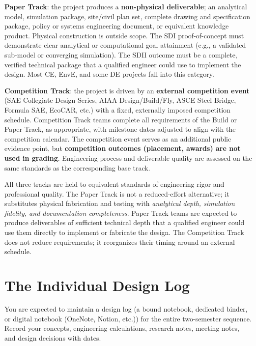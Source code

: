 \textbf{Paper Track}: the project produces a \textbf{non-physical deliverable}; an analytical model, simulation package, site/civil plan set, complete drawing and specification package, policy or systems engineering document, or equivalent knowledge product. Physical construction is outside scope. The SDI proof-of-concept must demonstrate clear analytical or computational goal attainment (e.g., a validated sub-model or converging simulation). The SDII outcome must be a complete, verified technical package that a qualified engineer could use to implement the design. Most CE, EnvE, and some DE projects fall into this category.

\textbf{Competition Track}: the project is driven by an \textbf{external competition event} (SAE Collegiate Design Series, AIAA Design/Build/Fly, ASCE Steel Bridge, Formula SAE, EcoCAR, etc.) with a fixed, externally imposed competition schedule. Competition Track teams complete all requirements of the Build or Paper Track, as appropriate, with milestone dates adjusted to align with the competition calendar. The competition event serves as an additional public evidence point, but \textbf{competition outcomes (placement, awards) are not used in grading}. Engineering process and deliverable quality are assessed on the same standards as the corresponding base track.

\begin{warningbox}
All three tracks are held to equivalent standards of engineering rigor and professional quality. The Paper Track is not a reduced-effort alternative; it substitutes physical fabrication and testing with \emph{analytical depth, simulation fidelity, and documentation completeness}. Paper Track teams are expected to produce deliverables of sufficient technical depth that a qualified engineer could use them directly to implement or fabricate the design. The Competition Track does not reduce requirements; it reorganizes their timing around an external schedule.
\end{warningbox}


\section{The Individual Design Log}
You are expected to maintain a design log (a bound notebook, dedicated binder, or digital notebook (OneNote, Notion, etc.)) for the entire two-semester sequence. Record your concepts, engineering calculations, research notes, meeting notes, and design decisions with dates.

